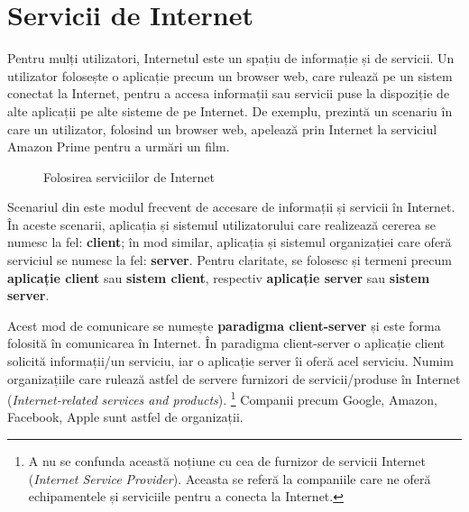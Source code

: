 \section{Servicii de Internet}
\label{sec:net:internet-services}

Pentru mulți utilizatori, Internetul este un spațiu de informație și de servicii.
Un utilizator folosește o aplicație precum un browser web, care rulează pe un sistem conectat la Internet, pentru a accesa informații sau servicii puse la dispoziție de alte aplicații pe alte sisteme de pe Internet.
De exemplu,  prezintă un scenariu în care un utilizator, folosind un browser web, apelează prin Internet la serviciul Amazon Prime pentru a urmări un film.

\begin{figure}[htbp]
  \centering
  \def\svgwidth{\columnwidth}
  
  \caption{Folosirea serviciilor de Internet}
  \label{fig:net:internet-amazon-service}
\end{figure}

Scenariul din  este modul frecvent de accesare de informații și servicii în Internet.
În aceste scenarii, aplicația și sistemul utilizatorului care realizează cererea se numesc la fel: \textbf{client};
în mod similar, aplicația și sistemul organizației care oferă serviciul se numesc la fel: \textbf{server}.
Pentru claritate, se folosesc și termeni precum \textbf{aplicație client} sau \textbf{sistem client}, respectiv \textbf{aplicație server} sau \textbf{sistem server}.

Acest mod de comunicare se numește \textbf{paradigma client-server} și este forma folosită în comunicarea în Internet.
În paradigma client-server o aplicație client solicită informații/un serviciu, iar o aplicație server îi oferă acel serviciu.
Numim organizațiile care rulează astfel de servere furnizori de servicii/produse în Internet (\textit{Internet-related services and products}).
\footnote{A nu se confunda această noțiune cu cea de furnizor de servicii Internet (\textit{Internet Service Provider}). Aceasta se referă la companiile care ne oferă echipamentele și serviciile pentru a conecta la Internet.}
Companii precum Google, Amazon, Facebook, Apple sunt astfel de organizații.

